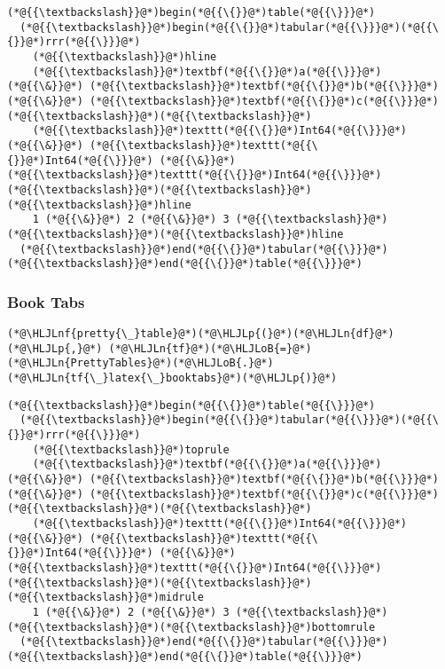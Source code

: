 \documentclass[12pt,a4paper]{article}
\newcommand{\HLJLn}[1]{#1}
\newcommand{\HLJLnf}[1]{\textcolor[RGB]{66,102,213}{#1}}
\newcommand{\HLJLoB}[1]{\textcolor[RGB]{102,102,102}{\textbf{#1}}}
\newcommand{\HLJLp}[1]{#1}
\begin{document}
\begin{lstlisting}
(*@{{\textbackslash}}@*)begin(*@{{\{}}@*)table(*@{{\}}}@*)
  (*@{{\textbackslash}}@*)begin(*@{{\{}}@*)tabular(*@{{\}}}@*)(*@{{\{}}@*)rrr(*@{{\}}}@*)
    (*@{{\textbackslash}}@*)hline
    (*@{{\textbackslash}}@*)textbf(*@{{\{}}@*)a(*@{{\}}}@*) (*@{{\&}}@*) (*@{{\textbackslash}}@*)textbf(*@{{\{}}@*)b(*@{{\}}}@*) (*@{{\&}}@*) (*@{{\textbackslash}}@*)textbf(*@{{\{}}@*)c(*@{{\}}}@*) (*@{{\textbackslash}}@*)(*@{{\textbackslash}}@*)
    (*@{{\textbackslash}}@*)texttt(*@{{\{}}@*)Int64(*@{{\}}}@*) (*@{{\&}}@*) (*@{{\textbackslash}}@*)texttt(*@{{\{}}@*)Int64(*@{{\}}}@*) (*@{{\&}}@*) (*@{{\textbackslash}}@*)texttt(*@{{\{}}@*)Int64(*@{{\}}}@*) (*@{{\textbackslash}}@*)(*@{{\textbackslash}}@*)(*@{{\textbackslash}}@*)hline
    1 (*@{{\&}}@*) 2 (*@{{\&}}@*) 3 (*@{{\textbackslash}}@*)(*@{{\textbackslash}}@*)(*@{{\textbackslash}}@*)hline
  (*@{{\textbackslash}}@*)end(*@{{\{}}@*)tabular(*@{{\}}}@*)
(*@{{\textbackslash}}@*)end(*@{{\{}}@*)table(*@{{\}}}@*)
\end{lstlisting}


\subsubsection{Book Tabs}

\begin{lstlisting}
(*@\HLJLnf{pretty{\_}table}@*)(*@\HLJLp{(}@*)(*@\HLJLn{df}@*)(*@\HLJLp{,}@*) (*@\HLJLn{tf}@*)(*@\HLJLoB{=}@*)(*@\HLJLn{PrettyTables}@*)(*@\HLJLoB{.}@*)(*@\HLJLn{tf{\_}latex{\_}booktabs}@*)(*@\HLJLp{)}@*)
\end{lstlisting}

\begin{lstlisting}
(*@{{\textbackslash}}@*)begin(*@{{\{}}@*)table(*@{{\}}}@*)
  (*@{{\textbackslash}}@*)begin(*@{{\{}}@*)tabular(*@{{\}}}@*)(*@{{\{}}@*)rrr(*@{{\}}}@*)
    (*@{{\textbackslash}}@*)toprule
    (*@{{\textbackslash}}@*)textbf(*@{{\{}}@*)a(*@{{\}}}@*) (*@{{\&}}@*) (*@{{\textbackslash}}@*)textbf(*@{{\{}}@*)b(*@{{\}}}@*) (*@{{\&}}@*) (*@{{\textbackslash}}@*)textbf(*@{{\{}}@*)c(*@{{\}}}@*) (*@{{\textbackslash}}@*)(*@{{\textbackslash}}@*)
    (*@{{\textbackslash}}@*)texttt(*@{{\{}}@*)Int64(*@{{\}}}@*) (*@{{\&}}@*) (*@{{\textbackslash}}@*)texttt(*@{{\{}}@*)Int64(*@{{\}}}@*) (*@{{\&}}@*) (*@{{\textbackslash}}@*)texttt(*@{{\{}}@*)Int64(*@{{\}}}@*) (*@{{\textbackslash}}@*)(*@{{\textbackslash}}@*)(*@{{\textbackslash}}@*)midrule
    1 (*@{{\&}}@*) 2 (*@{{\&}}@*) 3 (*@{{\textbackslash}}@*)(*@{{\textbackslash}}@*)(*@{{\textbackslash}}@*)bottomrule
  (*@{{\textbackslash}}@*)end(*@{{\{}}@*)tabular(*@{{\}}}@*)
(*@{{\textbackslash}}@*)end(*@{{\{}}@*)table(*@{{\}}}@*)
\end{lstlisting}
\end{document}
